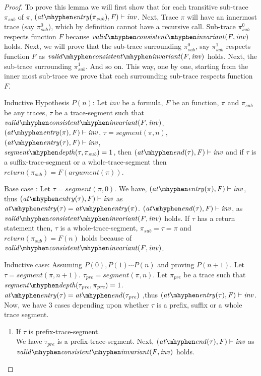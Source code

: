 \documentclass{llncs}
\newcommand{\trace}{\pi}
\newcommand{\inv}{\mathit{inv}}
\newcommand{\F}{\mathit{F}}
\newcommand{\n}{\textit{n}}
\newcommand{\satisfies}{\vdash}
\newcommand{\vci}[2]{\mathit{valid \mhyphen consistent \mhyphen
    invariant(#1, #2)}}
\newcommand{\atEntry}[1]{\mathit{at \mhyphen entry(#1)}}
\newcommand{\return}[1]{\mathit{return(#1)}}
\newcommand{\atEnd}[1]{\mathit{at \mhyphen end(#1)}}
\newcommand{\tSegment}{\tau}
\newcommand{\param}[1]{\mathit{argument(#1)}}
\newcommand{\segDepth}[2]{\mathit{segment \mhyphen depth(#1, #2)}} %
\newcommand{\subTrace}{\pi_{sub}}
\newcommand{\segment}[2]{\mathit{segment(#1, #2)}} %
\begin{document}
\begin{proof}
  To prove this lemma we will first show that for each transitive sub-trace
  $\subTrace$ of $\trace$, $(\atEntry{\subTrace}, \F) \satisfies
  \inv$. Next, Trace $\trace$ will have an innermost trace (say
  $\subTrace^0$), which by definition cannot have a recursive
  call. Sub-trace $\subTrace^0$ respects function $\F$ because
  $\vci{\F}{\inv}$ holds. Next, we will prove that the sub-trace
  surrounding $\subTrace^0$, say $\subTrace^1$ respects function $\F$
  as $\vci{\F}{\inv}$ holds. Next, the sub-trace surrounding
  $\subTrace^1$. And so on. This way, one by one, starting from the
  inner most sub-trace we prove that each surrounding sub-trace
  respects function $\F$.

  Inductive Hypothesis $P(n)$: Let $\inv$ be a formula, $\F$ be an
  function, $\trace$ and $\subTrace$ be any traces, $\tSegment$ be a
  trace-segment such that $\vci{\F}{\inv}$, $(\atEntry{\trace}, \F)
  \satisfies \inv$, $\tSegment = \segment{\trace}{n}$,
  $(\atEntry{\tSegment}, \F) \satisfies \inv$,\\
  $\segDepth{\tSegment}{\subTrace} = 1$, then $(\atEnd{\tSegment}, \F)
  \satisfies \inv$ and if $\tSegment$ is a suffix-trace-segment or a
  whole-trace-segment then $\return{\subTrace} =
  \F(\param{\trace})$.
  
  Base case : Let $\tSegment = \segment{\trace}{0}$. We have,
  $(\atEntry{\trace}, \F) \satisfies \inv$, thus $(\atEntry{\tSegment},
  \F) \satisfies \inv$ as $\atEntry{\tSegment} =
  \atEntry{\trace}$. $(\atEnd{\tSegment}, \F) \satisfies \inv$, as
  $\vci{\F}{\inv}$ holds. If $\tSegment$ has a return statement then,
  $\tSegment$ is a whole-trace-segment, $\subTrace = \tSegment =
  \trace$ and $\return{\subTrace} = \F(\n)$ holds because of
  $\vci{\F}{\inv}$.

  Inductive case: Assuming $P(0), P(1) \cdots P(n)$ and
  proving $P(n+1)$. Let $\tSegment =
  \segment{\trace}{n+1}$. $\tSegment_{pre} = \segment{\trace}{n}$. Let
  $\trace_{pre}$ be a trace such that
  $\segDepth{\tSegment_{pre}}{\trace_{pre}} = 1$.
  $\atEntry{\tSegment} = \atEnd{\tSegment_{pre}}$ ,thus
  $(\atEntry{\tSegment}, \F) \satisfies \inv$. Now, we have 3 cases
  depending upon whether $\tSegment$ is a prefix, suffix or a whole
  trace segment.

  \begin{enumerate}
  \item If $\tSegment$ is prefix-trace-segment.\\
    We have $\tSegment_{pre}$ is a prefix-trace-segment.  Next,
    $(\atEnd{\tSegment},\F) \satisfies \inv$ as \\$\vci{\F}{\inv}$
    holds.


\end{enumerate}
\end{proof}
\end{document}
